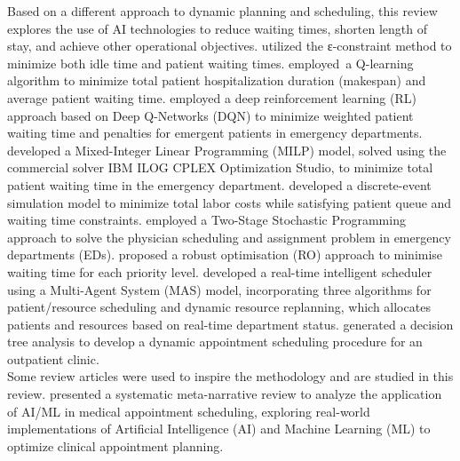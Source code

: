 \documentclass[runningheads]{llncs}
\begin{document}
Based on a different approach to dynamic planning and scheduling, this review explores the use of AI technologies to reduce waiting times, shorten length of stay, and achieve other operational objectives. \cite{fallahpour2024or} utilized the ε-constraint method to minimize both idle time and patient waiting times. \cite{bouchlaghem2024surgery} employed a Q-learning algorithm to minimize total patient hospitalization duration (makespan) and average patient waiting time. \cite{lee2020rl} employed a deep reinforcement learning (RL) approach based on Deep Q-Networks (DQN) to minimize weighted patient waiting time and penalties for emergent patients in emergency departments. \cite{harzi2017ed} developed a Mixed-Integer Linear Programming (MILP) model, solved using the commercial solver IBM ILOG CPLEX Optimization Studio, to minimize total patient waiting time in the emergency department. \cite{assad2019ed} developed a discrete-event simulation model to minimize total labor costs while satisfying patient queue and waiting time constraints. \cite{marchesi2020physician} employed a Two-Stage Stochastic Programming approach to solve the physician scheduling and assignment problem in emergency departments (EDs). \cite{mahmoudzadeh2020robust} proposed a robust optimisation (RO) approach to minimise waiting time for each priority level. \cite{munavalli2020mas} developed a real-time intelligent scheduler using a Multi-Agent System (MAS) model, incorporating three algorithms for patient/resource scheduling and dynamic resource replanning, which allocates patients and resources based on real-time department status. \cite{creps2017outpatient} generated a decision tree analysis to develop a dynamic appointment scheduling procedure for an outpatient clinic.\\
Some review articles were used to inspire the methodology and are studied in this review. \cite{knight2023review} presented a systematic meta-narrative review to analyze the application of AI/ML in medical appointment scheduling, exploring real-world implementations of Artificial Intelligence (AI) and Machine Learning (ML) to optimize clinical appointment planning.
\end{document}
